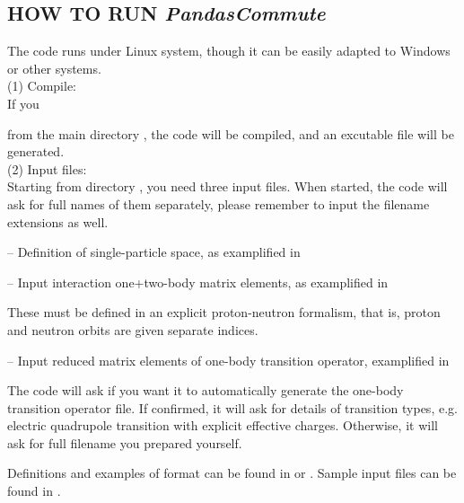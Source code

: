 \documentclass{article}
\begin{document}
\begin{spacing}{1.5}
\section{HOW TO RUN  {\it PandasCommute}}
The code runs under Linux system, though it can be easily adapted to Windows or other systems.\\

(1) Compile:\\

If you 

from the main directory , the code will be compiled, and an excutable file  will be generated.\\

(2) Input files:\\

Starting from directory , you need three input files. 
When started, the code will ask for full names of them separately, please remember to input the filename extensions as well.

-- Definition of single-particle space, as examplified in 

-- Input interaction one+two-body matrix elements, as examplified in 

These must be defined in an explicit proton-neutron formalism, that is, proton and neutron orbits are given separate indices. 

-- Input reduced matrix elements of one-body transition operator, examplified in 

The code will ask if you want it to automatically generate the one-body transition operator file. 
If confirmed, it will ask for details of transition types, e.g. electric quadrupole transition with explicit effective charges.
Otherwise, it will ask for full filename you prepared yourself.

Definitions and examples of format can be found in  or .
Sample input files can be found in .


\end{spacing}
\end{document}
